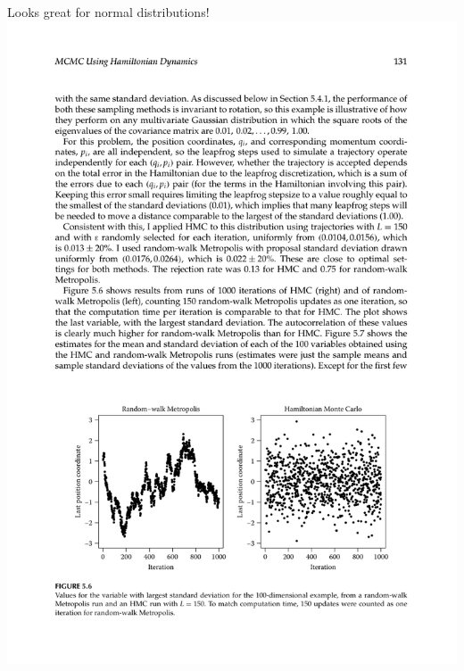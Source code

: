 \documentclass{beamer}
\begin{document}
    \begin{frame}{Looks great for normal distributions!}
        \includegraphics[width=\textwidth]{rw-vs-hmc.pdf}
    \end{frame}
\end{document}
